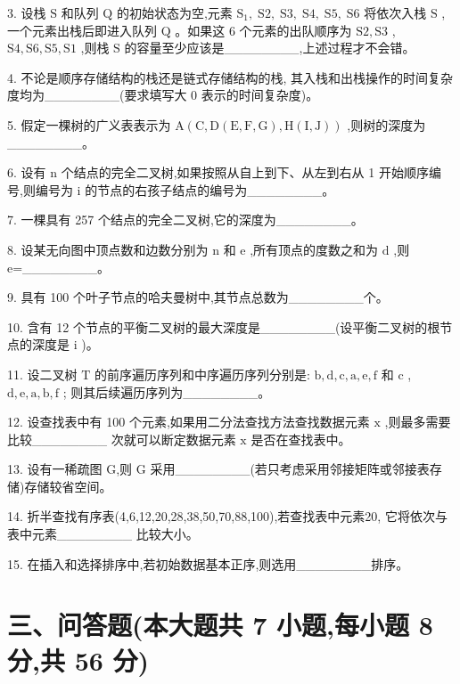 3. 设栈 \(\mathrm{S}\) 和队列 \(\mathrm{Q}\) 的初始状态为空,元素 \({\mathrm{S}}_{1},\mathrm{\;S}2,\mathrm{\;S}3,\mathrm{\;S}4,\mathrm{\;S}5,\mathrm{\;S}6\) 将依次入栈 \(\mathrm{S}\) ,一个元素出栈后即进入队列 \(\mathrm{Q}\) 。如果这 6 个元素的出队顺序为 \(\mathrm{S}2,\mathrm{S}3\) , \(\mathrm{S}4,\mathrm{S}6,\mathrm{S}5,\mathrm{S}1\) ,则栈 \(\mathrm{S}\) 的容量至少应该是\_\_\_\_\_\_\_\_,上述过程才不会错。

4. 不论是顺序存储结构的栈还是链式存储结构的栈, 其入栈和出栈操作的时间复杂度均为\_\_\_\_\_\_\_\_(要求填写大 0 表示的时间复杂度)。

5. 假定一棵树的广义表表示为 \(\mathrm{A}\left( {\mathrm{C},\mathrm{D}\left( {\mathrm{E},\mathrm{F},\mathrm{G}}\right) ,\mathrm{H}\left( {\mathrm{I},\mathrm{J}}\right) }\right)\) ,则树的深度为\_\_\_\_\_\_\_\_。

6. 设有 \(\mathrm{n}\) 个结点的完全二叉树,如果按照从自上到下、从左到右从 1 开始顺序编号,则编号为 \(\mathrm{i}\) 的节点的右孩子结点的编号为\_\_\_\_\_\_\_\_。

7. 一棵具有 257 个结点的完全二叉树,它的深度为\_\_\_\_\_\_\_\_。

8. 设某无向图中顶点数和边数分别为 \(\mathrm{n}\) 和 \(\mathrm{e}\) ,所有顶点的度数之和为 \(\mathrm{d}\) ,则 e=\_\_\_\_\_\_\_\_。

9. 具有 100 个叶子节点的哈夫曼树中,其节点总数为\_\_\_\_\_\_\_\_个。

10. 含有 12 个节点的平衡二叉树的最大深度是\_\_\_\_\_\_\_\_(设平衡二叉树的根节点的深度是 i )。

11. 设二叉树 \(\mathrm{T}\) 的前序遍历序列和中序遍历序列分别是: \(\mathrm{b},\mathrm{d},\mathrm{c},\mathrm{a},\mathrm{e},\mathrm{f}\) 和 \(\mathrm{c}\) , \(\mathrm{d},\mathrm{e},\mathrm{a},\mathrm{b},\mathrm{f}\) ; 则其后续遍历序列为\_\_\_\_\_\_\_\_。

12. 设查找表中有 100 个元素,如果用二分法查找方法查找数据元素 \(\mathrm{x}\) ,则最多需要比较\_\_\_\_\_\_\_\_ 次就可以断定数据元素 \(\mathrm{x}\) 是否在查找表中。

13. 设有一稀疏图 G,则 G 采用\_\_\_\_\_\_\_\_(若只考虑采用邻接矩阵或邻接表存储)存储较省空间。

14. 折半查找有序表(4,6,12,20,28,38,50,70,88,100),若查找表中元素20, 它将依次与表中元素\_\_\_\_\_\_\_\_ 比较大小。

15. 在插入和选择排序中,若初始数据基本正序,则选用\_\_\_\_\_\_\_\_排序。

\section*{三、问答题(本大题共 7 小题,每小题 8 分,共 56 分)}

